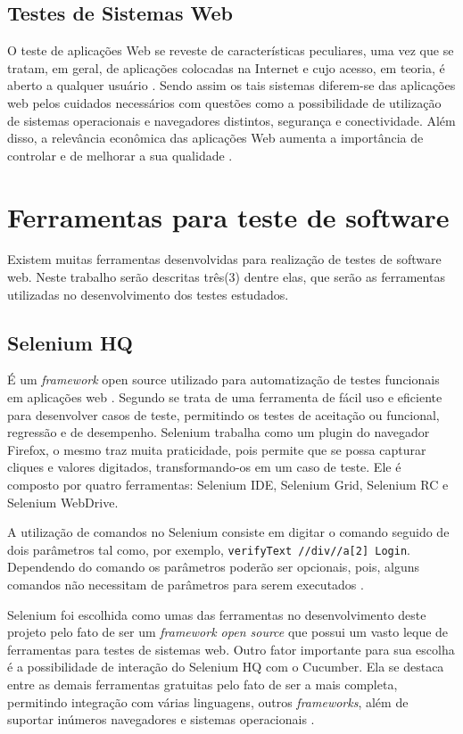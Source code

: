 \documentclass[tg]{mdtufsm}
\begin{document}
\subsection{Testes de Sistemas Web}
O teste de aplicações Web se reveste de características peculiares, uma vez que se tratam, em geral, de aplicações colocadas na Internet e cujo acesso, em teoria, é aberto a qualquer usuário \cite{rios2006teste}. Sendo assim os tais sistemas diferem-se das aplicações web pelos cuidados necessários com questões como a possibilidade de utilização de sistemas operacionais e navegadores distintos, segurança e conectividade. Além
disso, a relevância econômica das aplicações Web aumenta a importância de controlar e de
melhorar a sua qualidade \cite{fidelis2004fireweb}.


\section{Ferramentas para teste de software}
Existem muitas ferramentas desenvolvidas para realização de testes de software web. Neste trabalho serão descritas três(3) dentre elas, que serão as ferramentas utilizadas no desenvolvimento dos testes estudados.

\subsection{Selenium HQ}
É um \emph{framework} open source utilizado para automatização de testes funcionais em aplicações web \cite{chiavegatto1desenvolvimento}. Segundo \citeauthor{pereiraestudoselenium} \cite{pereiraestudoselenium} se trata
de uma ferramenta de fácil uso e eficiente para desenvolver casos de teste, permitindo os testes de aceitação ou funcional, regressão e de desempenho.
Selenium trabalha como um plugin do navegador Firefox, o mesmo traz muita praticidade, pois permite que se possa capturar cliques e valores digitados, transformando-os em um caso de teste. Ele é composto por
quatro ferramentas: Selenium IDE, Selenium Grid, Selenium RC e Selenium WebDrive.

A utilização de comandos no Selenium consiste em digitar o comando seguido de dois parâmetros tal como, por exemplo, \texttt{verifyText //div//a[2] Login}. Dependendo  do comando os parâmetros poderão ser opcionais, pois, alguns comandos não necessitam de parâmetros para serem executados \cite{sixpenceautomatizaccao}.

Selenium foi escolhida como umas das ferramentas no desenvolvimento deste projeto pelo fato de ser um \emph{framework open source} que possui um vasto leque de ferramentas para testes de sistemas web. Outro fator
importante para sua escolha é a possibilidade de interação do Selenium HQ com o Cucumber. Ela se destaca entre as demais ferramentas gratuitas pelo fato de ser a mais completa, permitindo integração com
várias linguagens, outros \emph{frameworks}, além de suportar inúmeros navegadores e sistemas operacionais \cite{pereiraestudoselenium}.
\end{document}
